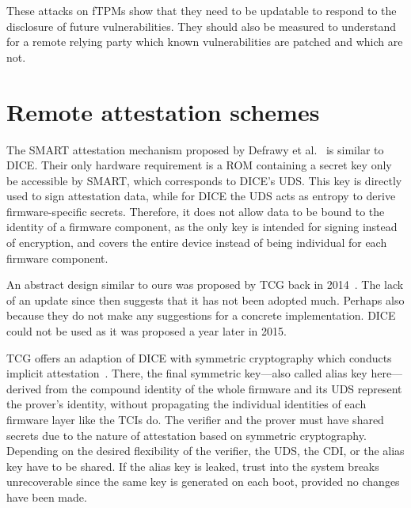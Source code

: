 These attacks on \acp{fTPM} show that they need to be updatable to respond to the disclosure of future vulnerabilities.
They should also be measured to understand for a remote relying party which known vulnerabilities are patched and which are not.

\section{Remote attestation schemes}



The SMART attestation mechanism proposed by Defrawy et al.~\cite{EURECOM+3536} is similar to \ac{DICE}.
Their only hardware requirement is a ROM containing a secret key only be accessible by SMART, which corresponds to DICE's \ac{UDS}.
This key is directly used to sign attestation data, while for \ac{DICE} the \ac{UDS} acts as entropy to derive firmware-specific secrets.
Therefore, it does not allow data to be bound to the identity of a firmware component, as the only key is intended for signing instead of encryption, and covers the entire device instead of being individual for each firmware component.

An abstract design similar to ours was proposed by \ac{TCG} back in 2014~\cite{tcgTpmMobile}.
The lack of an update since then suggests that it has not been adopted much. 
Perhaps also because they do not make any suggestions for a concrete implementation.
\Ac{DICE} could not be used as it was proposed a year later in 2015.

\Ac{TCG} offers an adaption of \ac{DICE} with symmetric cryptography which conducts implicit attestation~\cite{dice-symmetric-arch}.
There, the final symmetric key---also called alias key here---derived from the compound identity of the whole firmware and its \ac{UDS} represent the prover's identity, without propagating the individual identities of each firmware layer like the \acp{TCI} do.
The verifier and the prover must have shared secrets due to the nature of attestation based on symmetric cryptography.
Depending on the desired flexibility of the verifier, the \ac{UDS}, the \ac{CDI}, or the alias key have to be shared.
If the alias key is leaked, trust into the system breaks unrecoverable since the same key is generated on each boot, provided no changes have been made.


